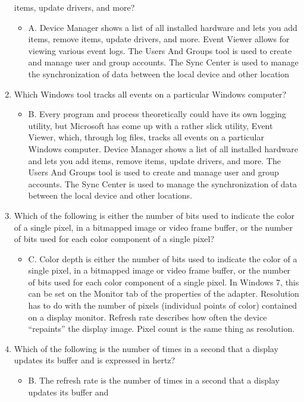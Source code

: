 \documentclass{article}
\begin{document}
\begin{enumerate}
items, update drivers, and more?
    \begin{itemize}
        \item A. Device Manager shows a list of all installed hardware and lets you add items, remove
items, update drivers, and more. Event Viewer allows for viewing various event logs. The
Users And Groups tool is used to create and manage user and group accounts. The Sync
Center is used to manage the synchronization of data between the local device and other
location
    \end{itemize}
    \item Which Windows tool tracks all events on a particular Windows computer?
    \begin{itemize}
        \item  B. Every program and process theoretically could have its own logging utility, but
Microsoft has come up with a rather slick utility, Event Viewer, which, through log files,
tracks all events on a particular Windows computer. Device Manager shows a list of all
installed hardware and lets you add items, remove items, update drivers, and more. The
Users And Groups tool is used to create and manage user and group accounts. The Sync
Center is used to manage the synchronization of data between the local device and other
locations.
    \end{itemize}
    \item Which of the following is either the number of bits used to indicate the color of a single
pixel, in a bitmapped image or video frame buffer, or the number of bits used for each color
component of a single pixel?
    \begin{itemize}
        \item C. Color depth is either the number of bits used to indicate the color of a single pixel,
in a bitmapped image or video frame buffer, or the number of bits used for each color
component of a single pixel. In Windows 7, this can be set on the Monitor tab of the
properties of the adapter. Resolution has to do with the number of pixels (individual points
of color) contained on a display monitor. Refresh rate describes how often the device
“repaints” the display image. Pixel count is the same thing as resolution.
    \end{itemize}
    \item Which of the following is the number of times in a second that a display updates its buffer
and is expressed in hertz?
    \begin{itemize}
        \item B. The refresh rate is the number of times in a second that a display updates its buffer and

\end{itemize}
\end{enumerate}
\end{document}
